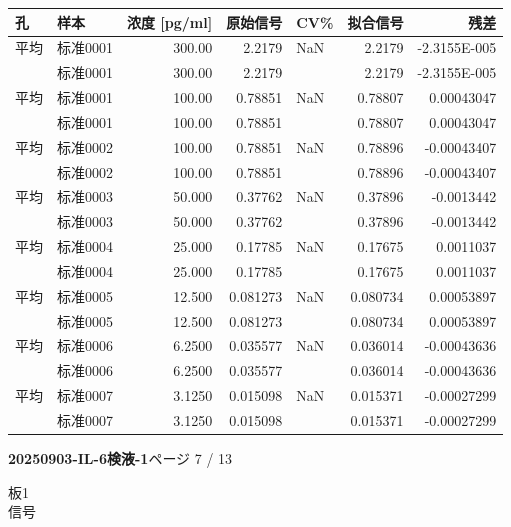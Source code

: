 \documentclass[UTF8,10pt,a4paper,fontset=fandol]{ctexart}
\begin{document}
\begin{center}
\small
\begin{tabular}{@{}l l r r l r r@{}}
\textbf{孔} & \textbf{样本} & \textbf{浓度 [pg/ml]} &
\textbf{原始信号} & \textbf{CV\%} & \textbf{拟合信号} & \textbf{残差}\\
\hline
平均 & 标准0001 & 300.00 & 2.2179 & NaN & 2.2179 & -2.3155E-005\\
     & 标准0001 & 300.00 & 2.2179 &      & 2.2179 & -2.3155E-005\\
平均 & 标准0001 & 100.00 & 0.78851 & NaN & 0.78807 & 0.00043047\\
     & 标准0001 & 100.00 & 0.78851 &      & 0.78807 & 0.00043047\\
平均 & 标准0002 & 100.00 & 0.78851 & NaN & 0.78896 & -0.00043407\\
     & 标准0002 & 100.00 & 0.78851 &      & 0.78896 & -0.00043407\\
平均 & 标准0003 & 50.000 & 0.37762 & NaN & 0.37896 & -0.0013442\\
     & 标准0003 & 50.000 & 0.37762 &      & 0.37896 & -0.0013442\\
平均 & 标准0004 & 25.000 & 0.17785 & NaN & 0.17675 & 0.0011037\\
     & 标准0004 & 25.000 & 0.17785 &      & 0.17675 & 0.0011037\\
平均 & 标准0005 & 12.500 & 0.081273 & NaN & 0.080734 & 0.00053897\\
     & 标准0005 & 12.500 & 0.081273 &      & 0.080734 & 0.00053897\\
平均 & 标准0006 & 6.2500 & 0.035577 & NaN & 0.036014 & -0.00043636\\
     & 标准0006 & 6.2500 & 0.035577 &      & 0.036014 & -0.00043636\\
平均 & 标准0007 & 3.1250 & 0.015098 & NaN & 0.015371 & -0.00027299\\
     & 标准0007 & 3.1250 & 0.015098 &      & 0.015371 & -0.00027299\\
\end{tabular}
\end{center}

\newpage

\noindent\textbf{20250903-IL-6検液-1}\hfill ページ 7 / 13

\medskip

\noindent 板1\\
\noindent 信号
\end{document}
